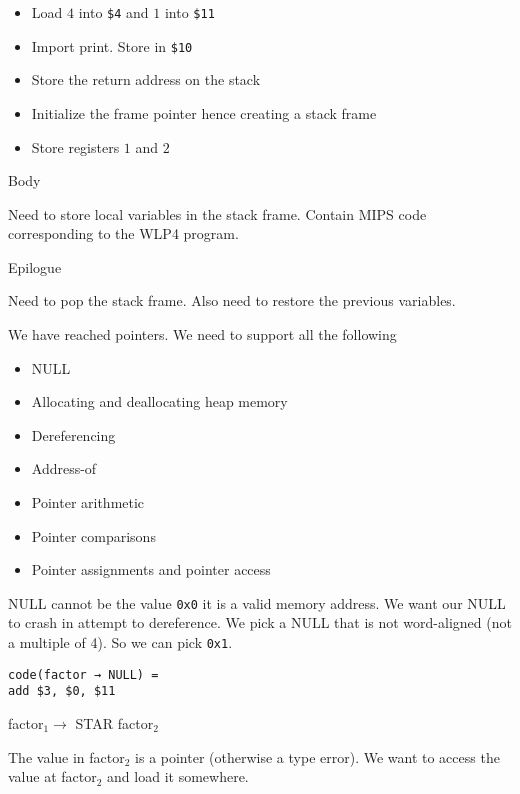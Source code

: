 \documentclass{article}
\begin{document}
\begin{itemize}
    \item Load \(4\) into \texttt{\$4} and
\(1\) into \texttt{\$11}
    \item Import print. Store in \texttt{\$10}
    \item Store
the return address on the stack 
    \item Initialize the frame pointer hence
creating a stack frame 
    \item  Store registers \(1\) and \(2\)
\end{itemize}


Body

Need to store local variables in the stack frame. Contain MIPS code
corresponding to the WLP4 program.

Epilogue

Need to pop the stack frame. Also need to restore the previous
variables.

We have reached pointers. We need to support all the following

\begin{itemize}
    \item NULL
    \item Allocating and deallocating heap memory
    \item Dereferencing
    \item Address-of
    \item Pointer arithmetic
    \item Pointer comparisons
    \item Pointer assignments and pointer access
\end{itemize}


NULL cannot be the value \texttt{0x0} it is a valid memory address. We
want our NULL to crash in attempt to dereference. We pick a NULL that is
not word-aligned (not a multiple of 4). So we can pick \texttt{0x1}.

\begin{tcolorbox}
\begin{verbatim}
code(factor → NULL) =
add $3, $0, $11
\end{verbatim}
\end{tcolorbox}


factor\(_1 \to\) STAR factor\(_2\)

The value in factor\(_2\) is a pointer (otherwise a type error). We want
to access the value at factor\(_2\) and load it somewhere.
\end{document}
